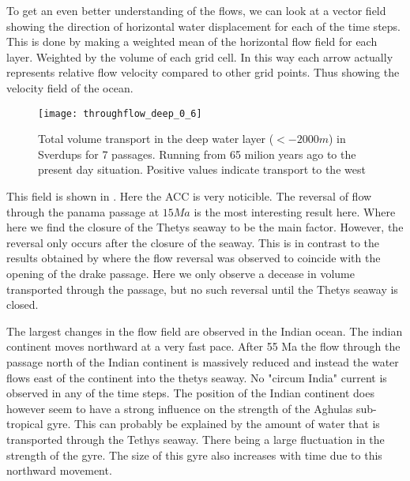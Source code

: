 To get an even better understanding of the flows, we can look at a vector field showing the direction of horizontal water displacement for each of the time steps. This is done by making a weighted mean of the horizontal flow field for each layer. Weighted by the volume of each grid cell. In this way each arrow actually represents relative flow velocity compared to other grid points. Thus showing the velocity field of the ocean. 

\begin{figure}[H]
	\texttt{[image: throughflow\_deep\_0\_6]}
	\caption{Total volume transport in the deep water layer ($<-2000m$) in Sverdups for 7 passages. Running from 65 milion years ago to the present day situation. Positive values indicate transport to the west}
	\label{fig:throughflow_bottom}
\end{figure}



This field is shown in . Here the ACC is very noticible. The reversal of flow through the panama passage at $15Ma$ is the most interesting result here.  Where here we find the closure of the Thetys seaway to be the main factor. However, the reversal only occurs after the closure of the seaway. This is in contrast to the results obtained by \cite{omta2003physical} where the flow reversal was observed to coincide with the opening of the drake passage. Here we only observe a decease in volume transported through the passage, but no such reversal until the Thetys seaway is closed.

The largest changes in the flow field are observed in the Indian ocean. The indian continent moves northward at a very fast pace. After 55 Ma the flow through the passage north of the Indian continent is massively reduced and instead the water flows east of the continent into the thetys seaway. No "circum India" current is observed in any of the time steps. The position of the Indian continent does however seem to have a strong influence on the strength of the Aghulas sub-tropical gyre. This can probably be explained by the amount of water that is transported through the Tethys seaway. There being a large fluctuation in the strength of the gyre. The size of this gyre also increases with time due to this northward movement.
